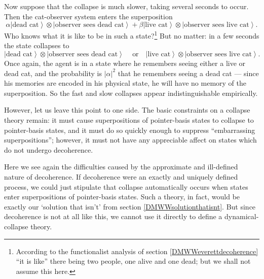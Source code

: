 \documentclass[12pt]{article}
\newcommand{\be}{\begin{equation}}
\newcommand{\ee}{\end{equation}}
\newcommand{\ket}[1]{\ensuremath{\left|  #1 \right\rangle}}
\newcommand{\tpk}[2]{\ensuremath{\ket{#1}\!\otimes\!\ket{#2}}}
\begin{document}
Now suppose that the collapse is much slower, taking several seconds to occur. Then the cat-observer system enters the superposition
\be
\alpha \tpk{\mathrm{\mbox{dead cat}}}{\mathrm{\mbox{observer sees dead cat}}}+ \beta
\tpk{\mathrm{\mbox{live cat}}}{\mathrm{\mbox{observer sees live cat}}}.
\ee
Who knows what it is like to be in such a state?\footnote{According to the functionalist analysis of section \ref{DMWWeverettdecoherence} ``it is like'' there being two people, one alive and one dead; but we shall not assume this here.}  But no matter: in a few seconds the state collapses to 
\be
\tpk{\mathrm{\mbox{dead cat}}}{\mathrm{\mbox{observer sees dead cat}}}\,\,\,\,\,\,\,\mathrm{\mbox{or}}\,\,\,\,\,\, 
\tpk{\mathrm{\mbox{live cat}}}{\mathrm{\mbox{observer sees live cat}}}.
\ee
Once again, the agent is in a state where he remembers seeing either a live or dead cat, and the probability is $|\alpha|^2$ that he remembers seeing a dead cat --- since his memories are encoded in his physical state, he will have no memory of the superposition. So the fast and slow collapses appear indistinguishable empirically.

However, let us leave this point to one side. The basic constraints on a collapse theory remain: it must cause superpositions of pointer-basis states to collapse to pointer-basis states, and it must do so quickly enough to suppress ``embarrassing superpositions''; however, it must not have any appreciable affect on states which do not undergo decoherence.

Here we see again the difficulties caused by the approximate and ill-defined nature of decoherence. If decoherence were an exactly and uniquely defined process, we could just stipulate that  collapse automatically occurs when states enter superpositions of pointer-basis states. Such a theory, in fact, would be exactly our `solution that isn't' from section \ref{DMWWsolutionthatisnt}. But since decoherence is not at all like this, we cannot use it directly to define a dynamical-collapse theory.
\end{document}
